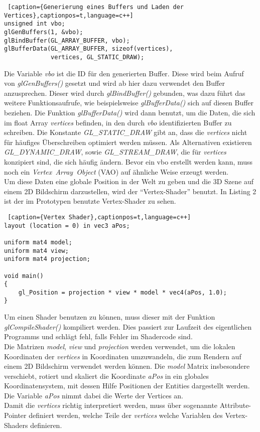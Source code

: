 \documentclass[11pt,a4paper]{article}
\begin{document}
\begin{lstlisting} [caption={Generierung eines Buffers und Laden der Vertices},captionpos=t,language=c++]
unsigned int vbo;
glGenBuffers(1, &vbo);
glBindBuffer(GL_ARRAY_BUFFER, vbo);
glBufferData(GL_ARRAY_BUFFER, sizeof(vertices),
             vertices, GL_STATIC_DRAW);
\end{lstlisting}
\noindent
Die Variable \textit{vbo} ist die ID für den generierten Buffer. Diese wird beim Aufruf von \mbox{\textit{glGenBuffers()}} gesetzt und wird ab hier dazu verwendet den Buffer anzusprechen. Dieser wird durch \mbox{\textit{glBindBuffer()}} gebunden, was dazu führt das weitere Funktionsaufrufe, wie beispielsweise \mbox{\textit{glBufferData()}} sich auf diesen Buffer beziehen. Die Funktion \mbox{\textit{glBufferData()}} wird dann benutzt, um die Daten, die sich im float Array \mbox{\textit{vertices}} befinden, in den durch \mbox{\textit{vbo}} identifizierten Buffer zu schreiben. Die Konstante \mbox{\textit{GL\_STATIC\_DRAW}} gibt an, dass die \mbox{\textit{vertices}} nicht für häufiges Überschreiben optimiert werden müssen. Als Alternativen existieren \mbox{\textit{GL\_DYNAMIC\_DRAW}}, sowie \mbox{\textit{GL\_STREAM\_DRAW}}, die für \mbox{\textit{vertices}} konzipiert sind, die sich häufig ändern. Bevor ein vbo erstellt werden kann, muss noch ein \mbox{\textit{Vertex Array Object}} (VAO) auf ähnliche Weise erzeugt werden.\\
Um diese Daten eine globale Position in der Welt zu geben und die 3D Szene auf einem 2D Bildschirm darzustellen, wird der ``Vertex-Shader'' benutzt. In Listing 2 ist der im Prototypen benutzte Vertex-Shader zu sehen.

\begin{lstlisting} [caption={Vertex Shader},captionpos=t,language=c++]
layout (location = 0) in vec3 aPos;

uniform mat4 model;
uniform mat4 view;
uniform mat4 projection;

void main()
{
	gl_Position = projection * view * model * vec4(aPos, 1.0);
}

\end{lstlisting}
\noindent
Um einen Shader benutzen zu können, muss dieser mit der Funktion \mbox{\textit{glCompileShader()}} kompiliert werden. Dies passiert zur Laufzeit des eigentlichen Programms und schlägt fehl, falls Fehler im Shadercode sind.\\
Die Matrizen \mbox{\textit{model}}, \mbox{\textit{view}} und \mbox{\textit{projection}} werden verwendet, um die lokalen Koordinaten der \mbox{\textit{vertices}} in Koordinaten umzuwandeln, die zum Rendern auf einem 2D Bildschirm verwendet werden können. Die \mbox{\textit{model}} Matrix insbesondere verschiebt, rotiert und skaliert die Koordinate \mbox{\textit{aPos}} in ein globales Koordinatensystem, mit dessen Hilfe Positionen der Entities dargestellt werden. Die Variable \mbox{\textit{aPos}} nimmt dabei die Werte der Vertices an.\\
Damit die \mbox{\textit{vertices}} richtig interpretiert werden, muss über sogenannte Attribute-Pointer definiert werden, welche Teile der \mbox{\textit{vertices}} welche Variablen des Vertex-Shaders definieren.
\end{document}
